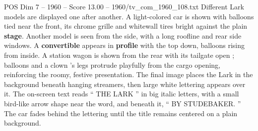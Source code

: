 \begin{textsample}{POS Dim 7 – 1960 – Score 13.00 – 1960/tv\_com\_1960\_108.txt}
Different Lark models are displayed one after another.
A light-colored car is shown with balloons tied near the front, its chrome grille and whitewall tires bright against the plain \textbf{stage}.
Another model is seen from the side, with a long roofline and rear side windows.
A \textbf{convertible} appears in \textbf{profile} with the top down, balloons rising from inside.
A station wagon is shown from the rear with its tailgate open ; balloons and a clown ’s legs protrude playfully from the cargo opening, reinforcing the roomy, festive presentation.
The final image places the Lark in the background beneath hanging streamers, then large white lettering appears over it.
The on-screen text reads “ THE LARK ” in big italic letters, with a small bird-like arrow shape near the word, and beneath it, “ BY STUDEBAKER. ” The car fades behind the lettering until the title remains centered on a plain background.

\end{textsample}
